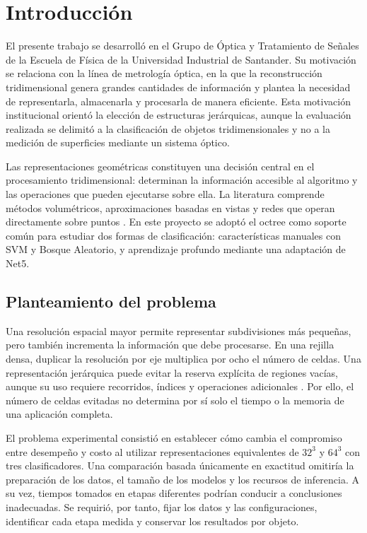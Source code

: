 \chapter{Introducción}
\label{chap:introduccion}

El presente trabajo se desarrolló en el Grupo de Óptica y Tratamiento de Señales de la Escuela de Física de la Universidad Industrial de Santander. Su motivación se relaciona con la línea de metrología óptica, en la que la reconstrucción tridimensional genera grandes cantidades de información y plantea la necesidad de representarla, almacenarla y procesarla de manera eficiente. Esta motivación institucional orientó la elección de estructuras jerárquicas, aunque la evaluación realizada se delimitó a la clasificación de objetos tridimensionales y no a la medición de superficies mediante un sistema óptico.

Las representaciones geométricas constituyen una decisión central en el procesamiento tridimensional: determinan la información accesible al algoritmo y las operaciones que pueden ejecutarse sobre ella. La literatura comprende métodos volumétricos, aproximaciones basadas en vistas y redes que operan directamente sobre puntos \parencite{wu2015,su2015,qi2017}. En este proyecto se adoptó el octree como soporte común para estudiar dos formas de clasificación: características manuales con SVM y Bosque Aleatorio, y aprendizaje profundo mediante una adaptación de Net5.

\section{Planteamiento del problema}
\label{sec:planteamiento}
Una resolución espacial mayor permite representar subdivisiones más pequeñas, pero también incrementa la información que debe procesarse. En una rejilla densa, duplicar la resolución por eje multiplica por ocho el número de celdas. Una representación jerárquica puede evitar la reserva explícita de regiones vacías, aunque su uso requiere recorridos, índices y operaciones adicionales \parencite{meagher1982,riegler2017}. Por ello, el número de celdas evitadas no determina por sí solo el tiempo o la memoria de una aplicación completa.

El problema experimental consistió en establecer cómo cambia el compromiso entre desempeño y costo al utilizar representaciones equivalentes de $32^3$ y $64^3$ con tres clasificadores. Una comparación basada únicamente en exactitud omitiría la preparación de los datos, el tamaño de los modelos y los recursos de inferencia. A su vez, tiempos tomados en etapas diferentes podrían conducir a conclusiones inadecuadas. Se requirió, por tanto, fijar los datos y las configuraciones, identificar cada etapa medida y conservar los resultados por objeto.

